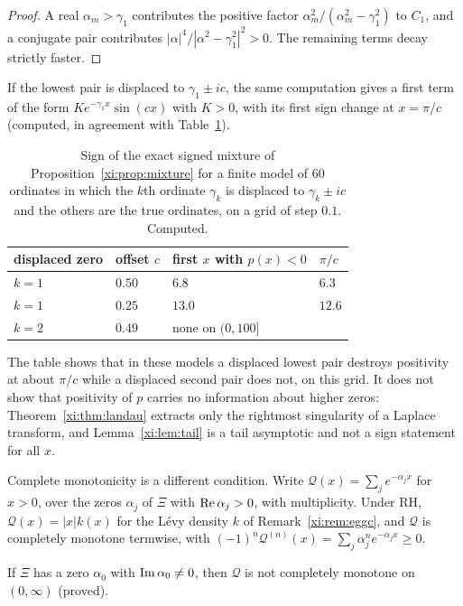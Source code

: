 \begin{proof}
A real $\alpha_m>\gamma_1$ contributes the positive factor $\alpha_m^2/(\alpha_m^2-\gamma_1^2)$ to $C_1$, and a conjugate pair contributes $|\alpha|^4/|\alpha^2-\gamma_1^2|^2>0$. The remaining terms decay strictly faster.
\end{proof}

If the lowest pair is displaced to $\gamma_1\pm ic$, the same computation gives a first term of the form $Ke^{-\gamma_1x}\sin(cx)$ with $K>0$, with its first sign change at $x=\pi/c$ (computed, in agreement with Table~\ref{xi:tab:density}).

\begin{table}[htbp]
\centering\small
\begin{tabular}{@{}llll@{}}
\toprule
displaced zero & offset $c$ & first $x$ with $p(x)<0$ & $\pi/c$\\
\midrule
$k=1$ & $0.50$ & $6.8$ & $6.3$\\
$k=1$ & $0.25$ & $13.0$ & $12.6$\\
$k=2$ & $0.49$ & none on $(0,100]$ & \\
\bottomrule
\end{tabular}
\caption{Sign of the exact signed mixture of Proposition~\ref{xi:prop:mixture} for a finite model of $60$ ordinates in which the $k$th ordinate $\gamma_k$ is displaced to $\gamma_k\pm ic$ and the others are the true ordinates, on a grid of step $0.1$. Computed.}
\label{xi:tab:density}
\end{table}

The table shows that in these models a displaced lowest pair destroys positivity at about $\pi/c$ while a displaced second pair does not, on this grid. It does not show that positivity of $p$ carries no information about higher zeros: Theorem~\ref{xi:thm:landau} extracts only the rightmost singularity of a Laplace transform, and Lemma~\ref{xi:lem:tail} is a tail asymptotic and not a sign statement for all $x$.

Complete monotonicity is a different condition. Write $\mathcal Q(x)=\sum_je^{-\alpha_jx}$ for $x>0$, over the zeros $\alpha_j$ of $\Xi$ with $\operatorname{Re}\alpha_j>0$, with multiplicity. Under RH, $\mathcal Q(x)=|x|k(x)$ for the L\'evy density $k$ of Remark~\ref{xi:rem:eggc}, and $\mathcal Q$ is completely monotone termwise, with $(-1)^n\mathcal Q^{(n)}(x)=\sum_j\alpha_j^ne^{-\alpha_jx}\ge0$.

\begin{proposition}\label{xi:prop:sharp}
If $\Xi$ has a zero $\alpha_0$ with $\operatorname{Im}\alpha_0\ne0$, then $\mathcal Q$ is not completely monotone on $(0,\infty)$ (proved).
\end{proposition}

